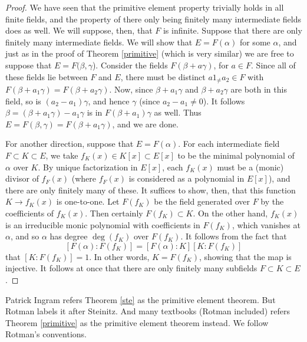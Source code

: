 \documentclass[12pt]{report}
\theoremstyle{definition}
\def\aa{\alpha}
\def\bb{\beta}
\begin{document}
\begin{proof}
    We have seen that the primitive element property trivially holds in all
finite fields, and the property of there only being finitely many intermediate fields does as well. We will suppose, then, that $F$ is infinite.
   Suppose that there are only finitely many intermediate fields. We will show that $E = F(\aa)$ for some $\aa$, and just as in the proof of Theorem \ref{primitive} (which is very similar) we are free to suppose that $E = F(\bb,\gamma$). Consider the fields $F(\bb + a\gamma)$, for $a \in F$. Since all of these fields lie between $F$ and $E$, there must be distinct $a1_ \not= a_2 \in F$ with $F(\bb + a_1 \gamma) = F(\bb + a_2\gamma)$. Now, since $\bb + a_1 \gamma$ and $\bb + a_2 \gamma$ are both in this field, so is $(a_2 - a_1)\gamma$, and hence $\gamma$ (since $a_2 - a_1 \not= 0$). It follows $\beta = (\beta+a_1\gamma) -a_1\gamma$ is in $F(\beta +a_1)\gamma$ as well. Thus $E = F(\bb,\gamma) = F(\bb + a_1\gamma)$, and we are done.

   For another direction, suppose that $E = F(\aa)$. For each intermediate field $F \subset K \subset E$, we take $f_K(x) \in K[x] \subset E[x]$ to be the minimal polynomial of $\aa$ over $K$. By unique factorization in $E[x]$, each $f_K(x)$ must be a (monic) divisor of $f_F(x)$ (where $f_F(x)$ is considered as a polynomial in $E[x]$), and there are only finitely many of these. It suffices to show, then, that this function $K \to f_K(x)$ is one-to-one. Let $F(f_K)$ be the field generated over $F$ by the coefficients of $f_K(x)$. Then certainly $F(f_K) \subset K$. On the other hand, $f_K(x)$ is an irreducible monic polynomial with coefficients in $F(f_K)$, which vanishes at $\aa$, and so $\aa$ has degree $\deg(f_K)$ over $F(f_K)$. It follows from the fact that
   $$[F(\aa):F(f_K)] = [F(\aa):K][K:F(f_K)]$$ that $[K : F(f_K)] = 1$. In other words, $K = F(f_K)$, showing that the map is injective. It follows at once that there are only finitely many subfields $F \subset K \subset E$.    
\end{proof}

\begin{remark}
    Patrick Ingram refers Theorem \ref{ste} as the primitive element theorem. But Rotman labels it after Steinitz. And many textbooks (Rotman included) refers Theorem \ref{primitive} as the primitive element theorem instead. We follow Rotman's conventions.
\end{remark}






\end{document}
